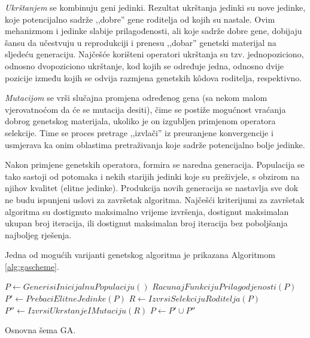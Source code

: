 \documentclass[b5paper, utf8, 11pt, colorlinks]{book}
\theoremstyle{definition}
\begin{document}
 \emph{Ukrštanjem} se kombinuju geni jedinki. Rezultat ukrštanja jedinki su nove jedinke, koje potencijalno sadrže ,,dobre'' gene  roditelja od kojih su nastale. Ovim mehanizmom  i jedinke slabije prilagođenosti, ali koje sadrže dobre gene, dobijaju šansu da učestvuju u reprodukciji i prenesu ,,dobar'' genetski materijal na sljedeću generaciju. Najčešće korišteni operatori ukrštanja su tzv. jednopoziciono, odnosno dvopoziciono ukrštanje, kod kojih se određuje jedna, odnosno dvije pozicije između kojih se odvija razmjena genetskih k\^odova roditelja, respektivno.
 
 \emph{Mutacijom} se vrši slučajna promjena određenog gena (sa nekom malom vjerovatnoćom da će se mutacija desiti), čime se postiže mogućnost vraćanja dobrog genetskog materijala, ukoliko je on izgubljen primjenom operatora selekcije. Time se proces pretrage  ,,izvlači'' iz preuranjene konvergencije i usmjerava ka onim oblastima pretraživanja koje sadrže potencijalno bolje jedinke.
 
 
 Nakon primjene genetskih operatora, formira se naredna generacija. Populacija se tako sastoji od potomaka i nekih starijih jedinki koje su preživjele, s obzirom na njihov kvalitet (elitne jedinke). Produkcija novih generacija se nastavlja sve dok ne budu ispunjeni uslovi za završetak algoritma. Najčešći kriterijumi za završetak algoritma su dostignuto maksimalno vrijeme izvršenja, dostignut  maksimalan ukupan broj iteracija, ili dostignut maksimalan broj iteracija bez poboljšanja najboljeg rješenja.
 
 Jedna od mogućih varijanti genetskog algoritma je prikazana Algoritmom \ref{alg:gascheme}.
 
 
 \begin{algorithm}[!htb]
 	\begin{algorithmic}[1]
 		\STATE  $ P \gets GenerisiInicijalnuPopulaciju()$
 			\STATE $RacunajFunkcijuPrilagodjenosti(P)$
 			\STATE $P' \gets PrebaciElitneJedinke(P)$
 			\STATE $R \gets IzvrsiSelekcijuRoditelja(P)$
 			\STATE $P'' \gets IzvrsiUkrstanjeIMutaciju(R)$		  
 			\STATE $P\gets P' \cup P''$
 		\ENDWHILE
 	\end{algorithmic}
 	\caption{Osnovna šema GA.}
 	\label{alg:gascheme}
 \end{algorithm}
 
\end{document}

